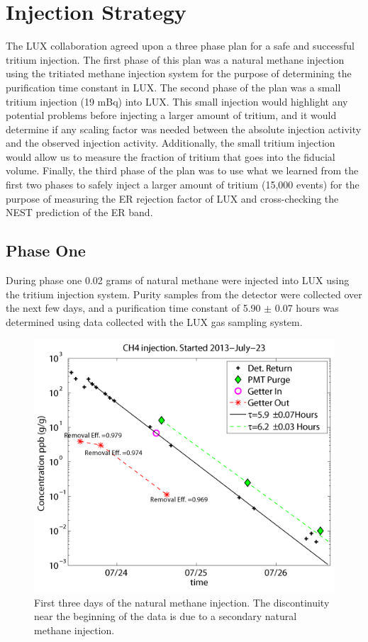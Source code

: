 \section{Injection Strategy}

The LUX collaboration agreed upon a three phase plan for a safe and successful tritium injection.  The first phase of this plan was a natural methane injection using the tritiated methane injection system for the purpose of determining the purification time constant in LUX.  The second phase of the plan was a small tritium injection (19 mBq) into LUX.  This small injection would highlight any potential problems before injecting a larger amount of tritium, and it would determine if any scaling factor was needed between the absolute injection activity and the observed injection activity.  Additionally, the small tritium injection would allow us to measure the fraction of tritium that goes into the fiducial volume.  Finally, the third phase of the plan was to use what we learned from the first two phases to safely inject a larger amount of tritium (15,000 events) for the purpose of measuring the ER rejection factor of LUX and cross-checking the NEST prediction of the ER band.

\subsection{Phase One}

During phase one 0.02 grams of natural methane were injected into LUX using the tritium injection system.  Purity samples from the detector were collected over the next few days, and a purification time constant of 5.90 $\pm$ 0.07 hours was determined using data collected with the LUX gas sampling system.

\begin{figure}[H]
\centering
\includegraphics[scale=0.3]{CH4_injection.png}
\caption{First three days of the natural methane injection.  The discontinuity near the beginning of the data is due to a secondary natural methane injection.}
\label{fig:CH4Inject}
\end{figure}

